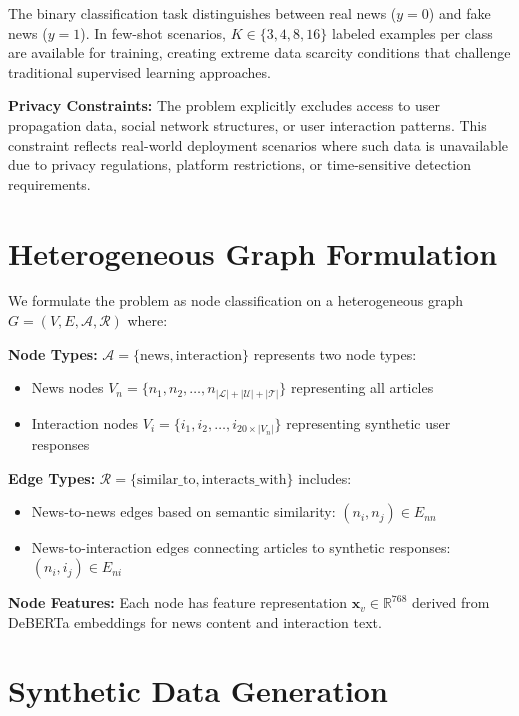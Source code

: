 The binary classification task distinguishes between real news ($y = 0$) and fake news ($y = 1$). In few-shot scenarios, $K \in \{3,4,8,16\}$ labeled examples per class are available for training, creating extreme data scarcity conditions that challenge traditional supervised learning approaches.

\textbf{Privacy Constraints:} The problem explicitly excludes access to user propagation data, social network structures, or user interaction patterns. This constraint reflects real-world deployment scenarios where such data is unavailable due to privacy regulations, platform restrictions, or time-sensitive detection requirements.

\section{Heterogeneous Graph Formulation}

We formulate the problem as node classification on a heterogeneous graph $G = (V, E, \mathcal{A}, \mathcal{R})$ where:

\textbf{Node Types:} $\mathcal{A} = \{\text{news}, \text{interaction}\}$ represents two node types:
\begin{itemize}
\item News nodes $V_n = \{n_1, n_2, \ldots, n_{|\mathcal{L}| + |\mathcal{U}| + |\mathcal{T}|}\}$ representing all articles
\item Interaction nodes $V_i = \{i_1, i_2, \ldots, i_{20 \times |V_n|}\}$ representing synthetic user responses
\end{itemize}

\textbf{Edge Types:} $\mathcal{R} = \{\text{similar\_to}, \text{interacts\_with}\}$ includes:
\begin{itemize}
\item News-to-news edges based on semantic similarity: $(n_i, n_j) \in E_{nn}$
\item News-to-interaction edges connecting articles to synthetic responses: $(n_i, i_j) \in E_{ni}$
\end{itemize}

\textbf{Node Features:} Each node has feature representation $\mathbf{x}_v \in \mathbb{R}^{768}$ derived from DeBERTa embeddings for news content and interaction text.

\section{Synthetic Data Generation}

